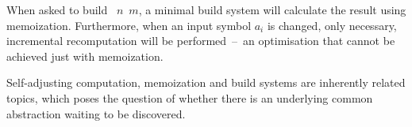 \noindent
When asked to build ~$n$~$m$, a minimal build system will calculate the
result using memoization. Furthermore, when an input symbol $a_i$ is changed,
only necessary, incremental recomputation will be performed~--~an optimisation
that cannot be achieved just with memoization.

Self-adjusting computation, memoization and build systems are inherently related
topics, which poses the question of whether there is an underlying common
abstraction waiting to be discovered.

\begin{comment}
\subsection{Profunctor Optics}\label{sec-related-optics}

The definition of \hs{Task} is:

\begin{verbatim}
newtype Task c k v = Task { run :: @\std{forall}@ f. c f => (k -> f v) -> f v }
\end{verbatim}

\noindent
Which looks tantalisingly close to the profunctor optics definition by
\cite{pickering2017profunctor}:

\begin{verbatim}
type Optic p a b s t = p a b -> p s t
\end{verbatim}
\noindent
Provided we instantiate \hs{p}~\hs{a}~\hs{b} to something like
\hs{k}~\hs{->}~\hs{f}~\hs{v}~--~which many of the actual instances in that paper
do. The properties of such optics are well studied, and the functions like
\hs{dependencies} are very much based on observations from that field of work.
Alas, we have been unable to remove the \hs{Maybe} used to encode whether a file
is an input, without complicating other aspects of our definition. Furthermore,
the \hs{Build} abstraction lacks any further such symmetry.
\end{comment}
